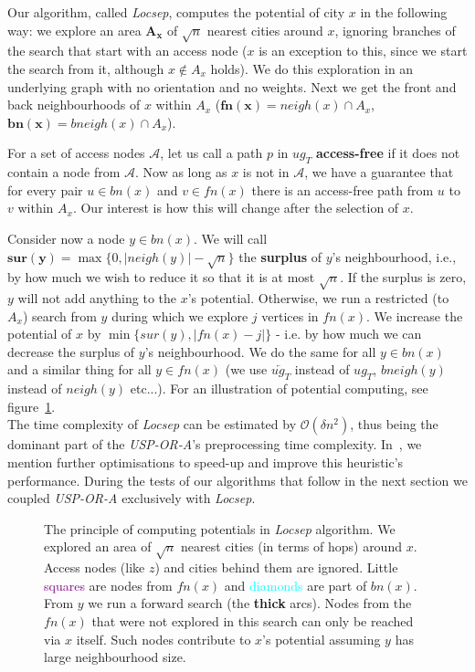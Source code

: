 \documentclass{svk_long_en}
\newcommand{\indt}{\hspace{6ex}}
\newcommand{\inputTikZ}[1]{%
    \beginpgfgraphicnamed{#1-external}%
    \endpgfgraphicnamed%
}
\begin{document}
		Our algorithm, called \textit{Locsep}, computes the potential of city $x$ in the following way: we explore an area $\bm{A_{x}}$ of $\sqrt{n}$ nearest cities around $x$, ignoring branches of the search that start with an access node ($x$ is an exception to this, since we start the search from it, although $x \not \in A_{x}$ holds). We do this exploration in an underlying graph with no orientation and no weights. Next we get the front and back neighbourhoods of $x$ within $A_{x}$ ($\bm{fn(x)} = neigh(x) \cap A_{x}$, $\bm{bn(x)} = bneigh(x) \cap A_{x}$).
		
		\indt For a set of access nodes $\mathcal{A}$, let us call a path $p$ in $ug_{T}$ \textbf{access-free} if it does not contain a node from $\mathcal{A}$. Now as long as $x$ is not in $\mathcal{A}$, we have a guarantee that for every pair $u \in bn(x)$ and $v \in fn(x)$ there is an access-free path from $u$ to $v$ within $A_{x}$. Our interest is how this will change after the selection of $x$.
				
		\indt Consider now a node $y \in bn(x)$. We will call $\bm{sur(y)} = \max\{0, |neigh(y)| - \sqrt{n}\}$ the \textbf{surplus} of $y$'s neighbourhood, i.e., by how much we wish to reduce it so that it is at most $\sqrt{n}$. If the surplus is zero, $y$ will not add anything to the $x$'s potential. Otherwise, we run a restricted (to $A_{x}$) search from $y$ during which we explore $j$ vertices in $fn(x)$. We increase the potential of $x$ by $\min\{sur(y), |fn(x) - j|\}$ - i.e. by how much we can decrease the surplus of $y$'s neighbourhood. We do the same for all $y \in bn(x)$ and a similar thing for all $y \in fn(x)$ (we use $\overleftarrow{ug_{T}}$ instead of $ug_{T}$, $bneigh(y)$ instead of $neigh(y)$ etc...). For an illustration of potential computing, see figure~\ref{fig:locsep}. \\
		
		The time complexity of \textit{Locsep} can be estimated by $\mathcal{O}(\delta n^{2})$, thus being the dominant part of the \textit{USP-OR-A}'s preprocessing time complexity. In~\cite{hajnresearch12}, we mention further optimisations to speed-up and improve this heuristic's performance. During the tests of our algorithms that follow in the next section we coupled \textit{USP-OR-A} exclusively with \textit{Locsep}.
		
		\begin{figure}[h]
			\begin{center}
				\inputTikZ{./tikzpics/locsep}
			\end{center}
			\caption{\label{fig:locsep} The principle of computing potentials in \textit{Locsep} algorithm. We explored an area of $\sqrt{n}$ nearest cities (in terms of hops) around $x$. Access nodes (like $z$) and cities behind them are ignored. Little \textcolor{purple}{squares} are nodes from $fn(x)$ and \textcolor{cyan}{diamonds} are part of $bn(x)$. From $y$ we run a forward search (the \textbf{thick} arcs). Nodes from the $fn(x)$ that were not explored in this search can only be reached via $x$ itself. Such nodes contribute to $x$'s potential assuming $y$ has large neighbourhood size.}
		\end{figure}
		
\end{document}

